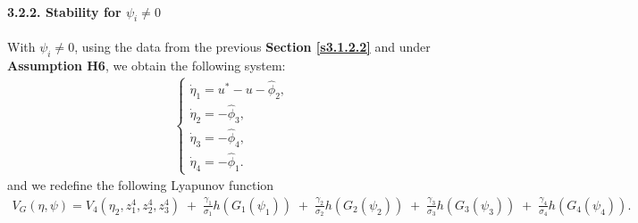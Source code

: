 \documentclass[10pt, a4paper]{amsart}
\theoremstyle{plain}
\theoremstyle{definition}
\theoremstyle{remark}
\numberwithin{equation}{section}
\begin{document}
\paragraph{\bf 3.2.2. Stability for $\psi_i\neq 0$}
With $\psi_i \neq 0$, using the data from the previous {\bf Section \ref{s3.1.2.2}} and under {\bf Assumption H6}, we obtain the following system:
\begin{align}\label{a3.115}
\begin{cases}
\dot\eta_1 = u^* - u - \hat \phi_2,\\
\dot\eta_2 = - \hat \phi_3,\\
\dot\eta_3 = - \hat \phi_4,\\
\dot\eta_4 = - \hat \phi_1.
\end{cases}
\end{align}
 and we redefine the following Lyapunov function 
\begin{align}\label{a3.114}
V_G(\eta,\psi)
= V_4(\eta_2,z^4_1,z^4_2,z^4_3)\;+\;\frac{\gamma_1}{\sigma_1}h(G_1(\psi_1))\;+\;\frac{\gamma_2}{\sigma_2}h(G_2(\psi_2))\;+\;\frac{\gamma_3}{\sigma_3}h(G_3(\psi_3))\;+\;\frac{\gamma_4}{\sigma_4}h(G_4(\psi_4)).
\end{align}
\end{document}
